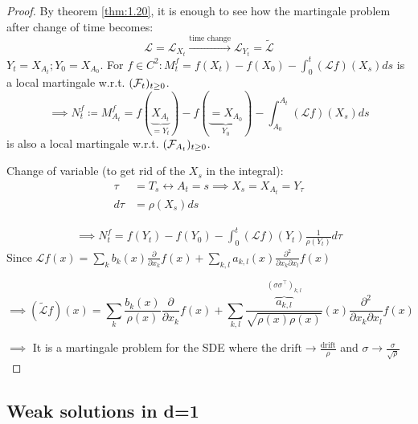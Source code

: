 \begin{proof}
    By theorem \ref{thm:1.20}, it is enough to see how the martingale problem after 
    change of time becomes: 
    \[\mathcal{L}=\mathcal{L}_{X_t}\stackrel{\text{time change}}{\longrightarrow}\mathcal{L}_{Y_t}=\tilde{\mathcal{L}}\]
    $Y_t=X_{A_t};Y_0=X_{A_0}$. For $f\in C^2: M_t^f=f(X_t)-f(X_0)-\int_0^t (\mathcal{L}f)(X_s)ds$ is a local martingale w.r.t. $(\mathcal{F}_t)_{t\geq 0}$.
    \[\implies N_t^f\coloneqq M_{A_t}^f=f(\underbrace{X_{A_t}}_{=Y_t})-f(\underbrace{=X_{A_0}}_{Y_0})-\int_{A_0}^{A_t}(\mathcal{L}f)(X_s)ds\]
    is also a local martingale w.r.t. $(\mathcal{F}_{A_t})_{t\geq 0}$.

    Change of variable (to get rid of the $X_s$ in the integral):
    \begin{align*}
        \tau&=T_s\leftrightarrow A_t=s \implies X_s=X_{A_t}=Y_\tau \\
        d\tau&=\rho(X_s)ds
    \end{align*}

    \begin{align*}
        \implies N_t^f=f(Y_t)-f(Y_0)-\int_0^t(\mathcal{L}f)(Y_t)\frac{1}{\rho(Y_t)}d\tau
    \end{align*} 
    Since $\mathcal{L}f(x)=\sum_{k}b_k(x)\frac{\partial}{\partial x_k}f(x)+\sum_{k,l}a_{k,l}(x)\frac{\partial^2}{\partial x_k\partial x_l} f(x)$

    \[\implies (\tilde{\mathcal{L}}f)(x)=\sum_{k}\frac{b_k(x)}{\rho(x)}\frac{\partial}{\partial x_k}f(x)+\sum_{k,l}\frac{\overbrace{a_{k,l}}^{(\sigma\sigma^\intercal)_{k,l}}}{\sqrt{{\rho(x)}{\rho(x)}}}(x)\frac{\partial^2}{\partial x_k\partial x_l} f(x)\]

    $\implies$ It is a martingale problem for the SDE 
    where the $\text{drift}\to\frac{\text{drift}}{\rho}$ and $\sigma\to \frac{\sigma}{\sqrt{\rho}}$

\end{proof}

\subsection{Weak solutions in d=1}

